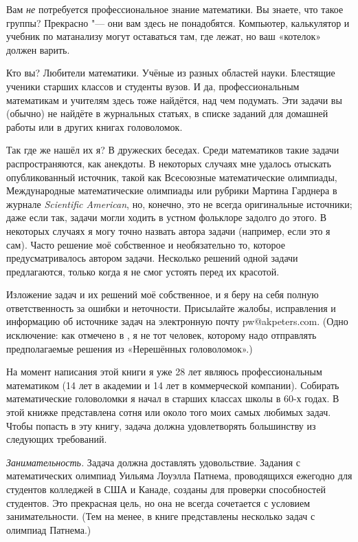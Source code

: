\documentclass[twoside]{book}
\begin{document}
Вам \emph{не} потребуется профессиональное знание математики.
Вы знаете, что такое группы? Прекрасно "---  они вам здесь не понадобятся.
Компьютер, калькулятор и учебник по матанализу могут оставаться там, где лежат, но ваш «котелок» должен варить.

Кто вы? Любители математики.
Учёные из разных областей науки.
Блестящие ученики старших классов и студенты вузов.
И да, профессиональным математикам и учителям здесь тоже найдётся, над чем подумать.
Эти задачи вы (обычно) не найдёте в журнальных статьях, в списке заданий для домашней работы или в других книгах головоломок.

Так где же нашёл их я? В дружеских беседах.
Среди математиков такие задачи распространяются, как анекдоты.
В некоторых случаях мне удалось отыскать опубликованный источник, такой как Всесоюзные математические олимпиады, Международные математические олимпиады или рубрики Мартина Гарднера в журнале \emph{Scientific American}, но, конечно, это не всегда оригинальные источники;
даже если так, задачи могли ходить в устном фольклоре задолго до этого.
В некоторых случаях я могу точно назвать автора задачи (например, если это я сам).
Часто решение моё собственное и необязательно то, которое предусматривалось автором задачи.
Несколько решений одной задачи предлагаются, только когда я не смог устоять перед их красотой.

Изложение задач и их решений моё собственное, и я беру на себя полную ответственность за ошибки и неточности.
Присылайте жалобы, исправления и информацию об источнике задач на электронную почту pw@akpeters.com.
(Одно исключение: как отмечено в , я не тот человек, которому надо отправлять предполагаемые решения из «Нерешённых головоломок».)

На момент написания этой книги я уже 28 лет являюсь профессиональным математиком
(14 лет в академии и 14 лет в коммерческой компании).
Собирать математические головоломки я начал в старших классах школы в 60-х годах.
В этой книжке представлена сотня или около того моих самых любимых задач.
Чтобы попасть в эту книгу, задача должна удовлетворять большинству из следующих требований.

\textit{Занимательность.}
Задача должна доставлять удовольствие.
Задания с математических олимпиад Уильяма Лоуэлла Патнема, проводящихся ежегодно для студентов колледжей в США и Канаде, созданы для проверки способностей студентов.
Это прекрасная цель, но она не всегда сочетается с условием занимательности.
(Тем на менее, в книге представлены несколько задач с олимпиад Патнема.)
\end{document}
